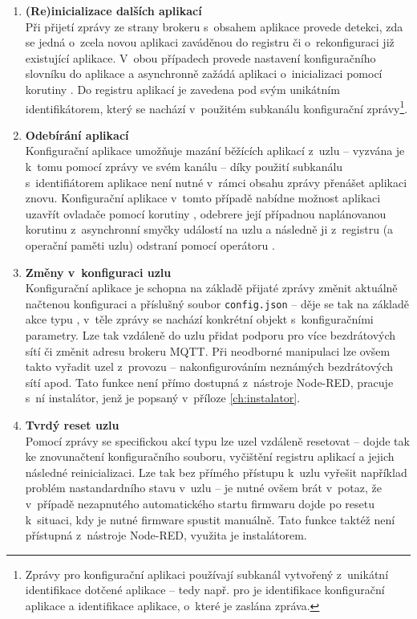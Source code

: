 \begin{enumerate}
    \item \textbf{(Re)inicializace dalších aplikací} \\
    Při přijetí zprávy ze strany brokeru s~obsahem 
    aplikace provede detekci, zda se jedná o~zcela novou aplikaci zaváděnou do registru či
    o~rekonfiguraci již existující aplikace. V~obou případech provede nastavení konfiguračního
    slovníku do aplikace a asynchronně zažádá aplikaci o~inicializaci pomocí korutiny .
    Do registru aplikací je zavedena pod svým unikátním identifikátorem, který se nachází v~použitém
    subkanálu konfigurační zprávy\footnote{Zprávy pro konfigurační aplikaci používají subkanál vytvořený
    z~unikátní identifikace dotčené aplikace -- tedy např. pro 
    je  identifikace konfigurační aplikace a  identifikace aplikace,
    o~které je zaslána zpráva.}.
    \item \textbf{Odebírání aplikací} \\
    Konfigurační aplikace umožňuje mazání běžících aplikací z~uzlu -- vyzvána je k~tomu pomocí zprávy
     ve svém kanálu -- díky použití subkanálu s~identifiátorem aplikace
    není nutné v~rámci obsahu zprávy přenášet aplikaci znovu. Konfigurační aplikace v~tomto případě
    nabídne možnost aplikaci uzavřít ovladače pomocí korutiny , odebrere její případnou
    naplánovanou korutinu z~asynchronní smyčky událostí na uzlu a následně ji z~registru (a operační paměti uzlu)
    odstraní pomocí operátoru .
    \item \textbf{Změny v~konfiguraci uzlu} \\
    Konfigurační aplikace je schopna na základě přijaté zprávy změnit aktuálně načtenou konfiguraci a příslušný
    soubor \texttt{config.json} -- děje se tak na základě akce typu , v~těle zprávy se nachází
    konkrétní objekt s~konfiguračními parametry. Lze tak vzdáleně do uzlu přidat podporu pro více bezdrátových sítí či
    změnit adresu brokeru MQTT. Při neodborné manipulaci lze ovšem takto vyřadit uzel z~provozu -- nakonfigurováním
    neznámých bezdrátových sítí apod. Tato funkce není přímo dostupná z~nástroje Node-RED, pracuje s~ní instalátor,
    jenž je popsaný v~příloze \ref{ch:instalator}.

    \item \textbf{Tvrdý reset uzlu} \\
    Pomocí zprávy se specifickou akcí typu  lze uzel vzdáleně resetovat -- dojde tak ke
    znovunačtení konfiguračního souboru, vyčištění registru aplikací a jejich následné reinicializaci.
    Lze tak bez přímého přístupu k~uzlu vyřešit například problém nastandardního stavu v~uzlu -- je nutné ovšem brát
    v~potaz, že v~případě nezapnutého automatického startu firmwaru dojde po resetu k~situaci, kdy je nutné firmware
    spustit manuálně. Tato funkce taktéž není přístupná z~nástroje Node-RED, využita je instalátorem.
\end{enumerate}
